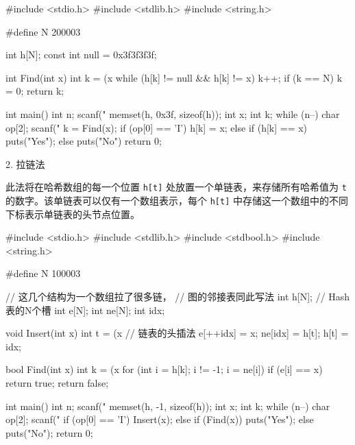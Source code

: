 \begin{mycpptwocol}[开放寻址法]
#include <stdio.h>
#include <stdlib.h>
#include <string.h>

#define N 200003

int h[N];
const int null = 0x3f3f3f3f;

int Find(int x)
{
    int k = (x %
    while (h[k] != null && h[k] != x) {
        k++;
        if (k == N) {
            k = 0;
        }
    }
    return k;
}

int main()
{
    int n;
    scanf("%
    memset(h, 0x3f, sizeof(h));
    int x;
    int k;
    while (n--) {
        char op[2];
        scanf("%
        k = Find(x);
        if (op[0] == 'I') {
            h[k] = x;
        } else {
            if (h[k] == x) {
                puts("Yes");
            } else {
                puts("No")
            }
        }
    }
    return 0;
}
\end{mycpptwocol}

2. 拉链法

此法将在哈希数组的每一个位置 \lstinline{h[t]} 处放置一个单链表，来存储所有哈希值为 \lstinline{t} 的数字。该单链表可以仅有一个数组表示，每个 \lstinline{h[t]} 中存储这一个数组中的不同下标表示单链表的头节点位置。

\begin{mycpptwocol}[拉链法]
#include <stdio.h>
#include <stdlib.h>
#include <stdbool.h>
#include <string.h>

#define N 100003

// 这几个结构为一个数组拉了很多链，
// 图的邻接表同此写法
int h[N]; // Hash表的N个槽
int e[N];
int ne[N];
int idx;

void Insert(int x)
{
    int t = (x %
    // 链表的头插法
    e[++idx] = x;
    ne[idx] = h[t];
    h[t] = idx;
}

bool Find(int x)
{
    int k = (x %
    for (int i = h[k]; i != -1; i = ne[i]) {
        if (e[i] == x) {
            return true;
        }
    }
    return false;
}

int main()
{
    int n;
    scanf("%
    memset(h, -1, sizeof(h));
    int x;
    int k;
    while (n--) {
        char op[2];
        scanf("%
        if (op[0] == 'I') {
            Insert(x);
        } else {
            if (Find(x)) {
                puts("Yes");
            } else {
                puts("No");
            }
        }
    }
    return 0;
}
\end{mycpptwocol}


